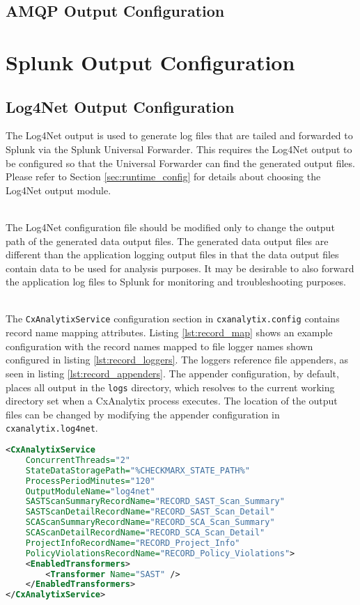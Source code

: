 \subsection{AMQP Output Configuration}

\section{Splunk Output Configuration}\label{sec:splunk_config}
\subsection{Log4Net Output Configuration}\label{sec:log4net_out}

The Log4Net output is used to generate log files that are tailed and forwarded to Splunk via the Splunk Universal Forwarder.  This requires the Log4Net
output to be configured so that the Universal Forwarder can find the generated output files.  Please refer to Section \ref{sec:runtime_config} for details
about choosing the Log4Net output module.

\noindent\\The Log4Net configuration file should be modified only to change the output path of the generated data output files.  The generated data output files are different
than the application logging output files in that the data output files contain data to be used for analysis purposes. It may be desirable to also forward
the application log files to Splunk for monitoring and troubleshooting purposes.

\noindent\\The \texttt{CxAnalytixService} configuration section in \texttt{cxanalytix.config} contains record name mapping attributes.  Listing \ref{lst:record_map}
shows an example configuration with the record names mapped to file logger names shown configured in listing \ref{lst:record_loggers}.  The loggers
reference file appenders, as seen in listing \ref{lst:record_appenders}.  The appender configuration, by default, places all output in the \texttt{logs}
directory, which resolves to the current working directory set when a CxAnalytix process executes.  The location of the output files can be changed
by modifying the appender configuration in \texttt{cxanalytix.log4net}.


\begin{lstlisting}[caption={Example Record Map Configuration}, label={lst:record_map}, language=XML]
<CxAnalytixService 
    ConcurrentThreads="2" 
    StateDataStoragePath="%CHECKMARX_STATE_PATH%"
    ProcessPeriodMinutes="120"
    OutputModuleName="log4net"
    SASTScanSummaryRecordName="RECORD_SAST_Scan_Summary"
    SASTScanDetailRecordName="RECORD_SAST_Scan_Detail"
    SCAScanSummaryRecordName="RECORD_SCA_Scan_Summary"
    SCAScanDetailRecordName="RECORD_SCA_Scan_Detail"
    ProjectInfoRecordName="RECORD_Project_Info"
    PolicyViolationsRecordName="RECORD_Policy_Violations">
    <EnabledTransformers>
        <Transformer Name="SAST" />
    </EnabledTransformers>
</CxAnalytixService>
\end{lstlisting}

